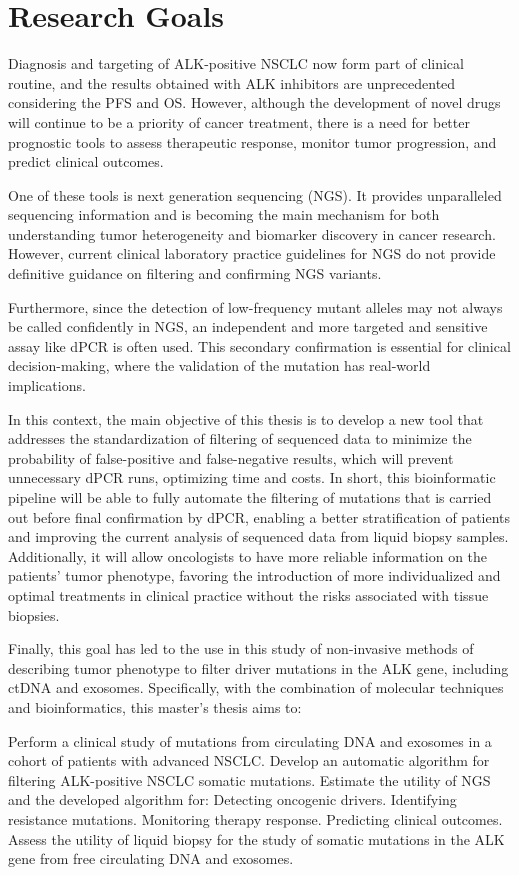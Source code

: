 \chapter{Research Goals}

Diagnosis and targeting of ALK-positive NSCLC now form part of clinical routine, and the results obtained with ALK inhibitors are unprecedented considering the PFS and OS. However, although the development of novel drugs will continue to be a priority of cancer treatment, there is a need for better prognostic tools to assess therapeutic response, monitor tumor progression, and predict clinical outcomes.

One of these tools is next generation sequencing (NGS). It provides unparalleled sequencing information and is becoming the main mechanism for both understanding tumor heterogeneity and biomarker discovery in cancer research. However, current clinical laboratory practice guidelines for NGS do not provide definitive guidance on filtering and confirming NGS variants.

Furthermore, since the detection of low-frequency mutant alleles may not always be called confidently in NGS, an independent and more targeted and sensitive assay like dPCR is often used. This secondary confirmation is essential for clinical decision-making, where the validation of the mutation has real-world implications.

In this context, the main objective of this thesis is to develop a new tool that addresses the standardization of filtering of sequenced data to minimize the probability of false-positive and false-negative results, which will prevent unnecessary dPCR runs, optimizing time and costs. In short, this bioinformatic pipeline will be able to fully automate the filtering of mutations that is carried out before final confirmation by dPCR, enabling a better stratification of patients and improving the current analysis of sequenced data from liquid biopsy samples. Additionally, it will allow oncologists to have more reliable information on the patients' tumor phenotype, favoring the introduction of more individualized and optimal treatments in clinical practice without the risks associated with tissue biopsies.

Finally, this goal has led to the use in this study of non-invasive methods of describing tumor phenotype to filter driver mutations in the ALK gene, including ctDNA and exosomes. Specifically, with the combination of molecular techniques and bioinformatics, this master's thesis aims to:
\begin{outline}
    \1 Perform a clinical study of mutations from circulating DNA and exosomes in a cohort of patients with advanced NSCLC.
    \1 Develop an automatic algorithm for filtering ALK-positive NSCLC somatic mutations.
    \1 Estimate the utility of NGS and the developed algorithm for:
        \2 Detecting oncogenic drivers.
        \2 Identifying resistance mutations.
        \2 Monitoring therapy response.
        \2 Predicting clinical outcomes.
    \1 Assess the utility of liquid biopsy for the study of somatic mutations in the ALK gene from free circulating DNA and exosomes.
\end{outline}